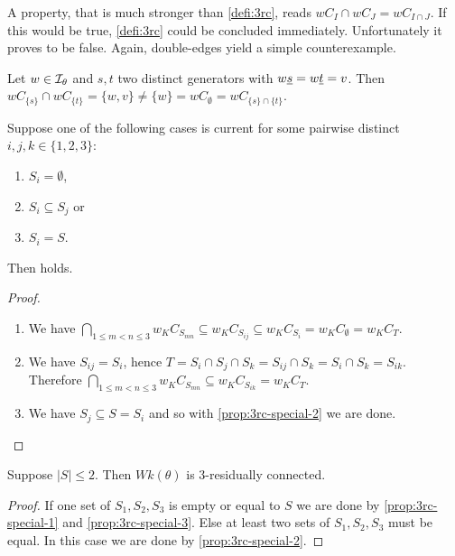 A property, that is much stronger than \ref{defi:3rc}, reads $wC_I \cap wC_J = wC_{I \cap J}$. If this would be true, \ref{defi:3rc} could be concluded immediately. Unfortunately it proves to be false. Again, double-edges yield a simple counterexample.

\begin{exam}
	Let $w \in \mathcal{I}_{\theta}$ and $s,t$ two distinct generators with $w \underline{s} = w \underline{t} = v$. Then $wC_{\{s\}} \cap wC_{\{t\}} = \{w,v\} \neq \{w\} = wC_{\emptyset} = wC_{\{s\} \cap \{t\}}$.
\end{exam}

\begin{prop}
	Suppose one of the following cases is current for some pairwise distinct $i,j,k \in \{1,2,3\}$:
	\begin{enumerate}
		\item \label{prop:3rc-special-1} $S_i = \emptyset$,
		\item \label{prop:3rc-special-2} $S_i \subseteq S_j$ or
		\item \label{prop:3rc-special-3} $S_i = S$.
	\end{enumerate}
	Then  holds.

	\begin{proof}
		\begin{enumerate}
			\item We have $\bigcap_{1 \leq m < n \leq 3} w_K C_{S_{mn}} \subseteq w_K C_{S_{ij}} \subseteq w_K C_{S_{i}} = w_K C_\emptyset = w_K C_T$.
			\item We have $S_{ij} = S_i$, hence $T = S_i \cap S_j \cap S_k = S_{ij} \cap S_k = S_i \cap S_k = S_{ik}$. Therefore $\bigcap_{1 \leq m < n \leq 3} w_K C_{S_{mn}} \subseteq w_K C_{S_{ik}} = w_K C_T$.
			\item We have $S_j \subseteq S = S_i$ and so with \ref{prop:3rc-special-2} we are done.
		\end{enumerate}
	\end{proof}
\end{prop}

\begin{coro}
	Suppose $|S| \leq 2$. Then $Wk(\theta)$ is 3-residually connected.

	\begin{proof}
		If one set of $S_1,S_2,S_3$ is empty or equal to $S$ we are done by \ref{prop:3rc-special-1} and \ref{prop:3rc-special-3}. Else at least two sets of $S_1,S_2,S_3$ must be equal. In this case we are done by \ref{prop:3rc-special-2}.
	\end{proof}
\end{coro}